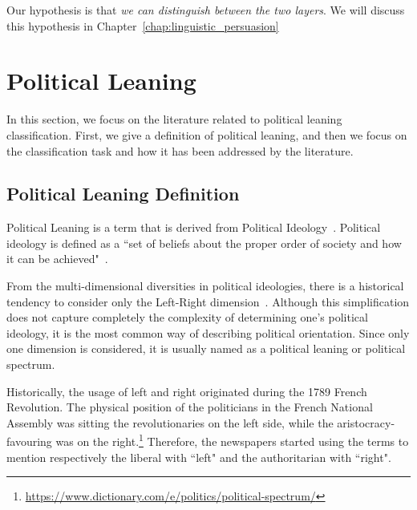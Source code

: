 

Our hypothesis is that \emph{we can distinguish between the two layers}.
We will discuss this hypothesis in Chapter~\ref{chap:linguistic_persuasion}


\section{\statusgreen Political Leaning}
\label{sec:lit_leaning}

In this section, we focus on the literature related to political leaning classification.
First, we give a definition of political leaning, and then we focus on the classification task and how it has been addressed by the literature.

\subsection{\statusgreen Political Leaning Definition}

Political Leaning is a term that is derived from Political Ideology~\citep{jost2009political}.
Political ideology is defined as a ``set of beliefs about the proper order of society and how it can be achieved"~\citep[p.~64]{erikson2015american}.

From the multi-dimensional diversities in political ideologies, there is a historical tendency to consider only the Left-Right dimension~\citep{jost2009political}.
Although this simplification does not capture completely the complexity of determining one's political ideology, it is the most common way of describing political orientation.
Since only one dimension is considered, it is usually named as a political leaning or political spectrum.


Historically, the usage of left and right originated during the 1789 French Revolution. The physical position of the politicians in the French National Assembly was sitting the revolutionaries on the left side, while the aristocracy-favouring was on the right.\footnote{\url{https://www.dictionary.com/e/politics/political-spectrum/}}
Therefore, the newspapers started using the terms to mention respectively the liberal with ``left" and the authoritarian with ``right".

